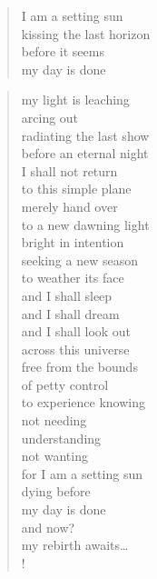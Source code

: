 

\prelude

\begin{verse}

I am a setting sun\\
kissing the last horizon\\
before it seems \\
my day is done\\

\end{verse}

\fugue

\begin{verse}

my light is leaching\\
arcing out\\
radiating the last show\\
before an eternal night\\
I shall not return\\
to this simple plane\\
merely hand over\\
to a new dawning light\\
bright in intention\\
seeking a new season\\
to weather its face\\
and I shall sleep\\
and I shall dream\\
and I shall look out\\
across this universe\\
free from the bounds\\
of petty control\\
to experience knowing\\
not needing\\
understanding\\
not wanting\\
for I am a setting sun\\
dying before \\
my day is done\\
and now?\\
my rebirth awaits\ldots\\!

\end{verse}

\endinput

